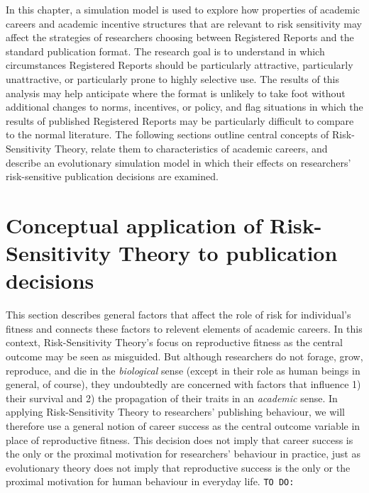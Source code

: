 \documentclass[british,,doc,mask,floatsintext]{apa6}
\begin{document}
In this chapter, a simulation model is used to explore how properties of academic careers and academic incentive structures that are relevant to risk sensitivity may affect the strategies of researchers choosing between Registered Reports and the standard publication format.
The research goal is to understand in which circumstances Registered Reports should be particularly attractive, particularly unattractive, or particularly prone to highly selective use.
The results of this analysis may help anticipate where the format is unlikely to take foot without additional changes to norms, incentives, or policy, and flag situations in which the results of published Registered Reports may be particularly difficult to compare to the normal literature.
The following sections outline central concepts of Risk-Sensitivity Theory, relate them to characteristics of academic careers, and describe an evolutionary simulation model in which their effects on researchers' risk-sensitive publication decisions are examined.

\hypertarget{conceptual-application-of-risk-sensitivity-theory-to-publication-decisions}{%
\section{Conceptual application of Risk-Sensitivity Theory to publication decisions}\label{conceptual-application-of-risk-sensitivity-theory-to-publication-decisions}}

This section describes general factors that affect the role of risk for individual's fitness and connects these factors to relevent elements of academic careers.
In this context, Risk-Sensitivity Theory's focus on reproductive fitness as the central outcome may be seen as misguided.
But although researchers do not forage, grow, reproduce, and die in the \emph{biological} sense (except in their role as human beings in general, of course), they undoubtedly are concerned with factors that influence 1) their survival and 2) the propagation of their traits in an \emph{academic} sense.
In applying Risk-Sensitivity Theory to researchers' publishing behaviour, we will therefore use a general notion of career success as the central outcome variable in place of reproductive fitness.
This decision does not imply that career success is the only or the proximal motivation for researchers' behaviour in practice, just as evolutionary theory does not imply that reproductive success is the only or the proximal motivation for human behaviour in everyday life.
\texttt{TO\ DO:}
\end{document}
